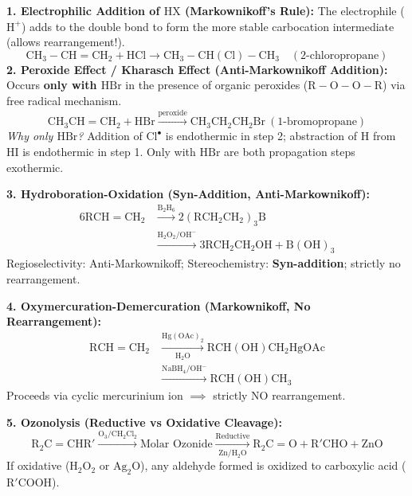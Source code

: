 \documentclass[10pt,twoside,openright]{book}
\begin{document}
\begin{formulabox}
\textbf{1. Electrophilic Addition of $\mathrm{HX}$ (Markownikoff's Rule):}
The electrophile ($\mathrm{H}^+$) adds to the double bond to form the more stable carbocation intermediate (allows rearrangement!).
\begin{equation}
  \mathrm{CH_3-CH=CH_2} + \mathrm{HCl} \longrightarrow \mathrm{CH_3-CH(Cl)-CH_3} \quad (2\text{-chloropropane})
\end{equation}
\textbf{2. Peroxide Effect / Kharasch Effect (Anti-Markownikoff Addition):}
Occurs \textbf{only with $\mathrm{HBr}$} in the presence of organic peroxides ($\mathrm{R-O-O-R}$) via free radical mechanism.
\begin{equation*}
  \mathrm{CH_3CH=CH_2} + \mathrm{HBr} \xrightarrow{\text{peroxide}} \mathrm{CH_3CH_2CH_2Br} \ (1\text{-bromopropane})
\end{equation*}
\textit{Why only $\mathrm{HBr}$?} Addition of $\mathrm{Cl}^\bullet$ is endothermic in step 2; abstraction of $\mathrm{H}$ from $\mathrm{HI}$ is endothermic in step 1. Only with $\mathrm{HBr}$ are both propagation steps exothermic.

\textbf{3. Hydroboration-Oxidation (Syn-Addition, Anti-Markownikoff):}
\begin{align*}
  6\mathrm{RCH=CH_2} &\xrightarrow{\mathrm{B_2H_6}} 2(\mathrm{RCH_2CH_2})_3\mathrm{B} \\
  &\xrightarrow{\mathrm{H_2O_2 / OH^-}} 3\mathrm{RCH_2CH_2OH} + \mathrm{B(OH)}_3
\end{align*}
Regioselectivity: Anti-Markownikoff; Stereochemistry: \textbf{Syn-addition}; strictly no rearrangement.

\textbf{4. Oxymercuration-Demercuration (Markownikoff, No Rearrangement):}
\begin{align*}
  \mathrm{RCH=CH_2} &\xrightarrow[\mathrm{H_2O}]{\mathrm{Hg(OAc)_2}} \mathrm{RCH(OH)CH_2HgOAc} \\
  &\xrightarrow{\mathrm{NaBH_4 / OH^-}} \mathrm{RCH(OH)CH_3}
\end{align*}
Proceeds via cyclic mercurinium ion $\implies$ strictly NO rearrangement.

\textbf{5. Ozonolysis (Reductive vs Oxidative Cleavage):}
\begin{equation}
  \mathrm{R_2C=CHR'} \xrightarrow{\mathrm{O_3 / CH_2Cl_2}} \text{Molar Ozonide} \xrightarrow[\mathrm{Zn / H_2O}]{\text{Reductive}} \mathrm{R_2C=O} + \mathrm{R'CHO} + \mathrm{ZnO}
\end{equation}
If oxidative ($\mathrm{H_2O_2}$ or $\mathrm{Ag_2O}$), any aldehyde formed is oxidized to carboxylic acid ($\mathrm{R'COOH}$).
\end{formulabox}
\end{document}
